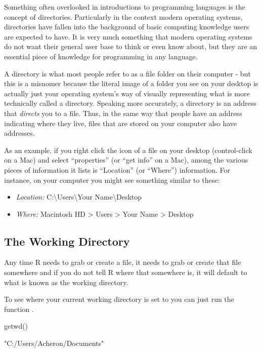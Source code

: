 Something often overlooked in introductions to programming languages is the concept of directories. Particularly in the context modern operating systems, directories have fallen into the background of basic computing knowledge users are expected to have. It is very much something that modern operating systems do not want their general user base to think or even know about, but they are an essential piece of knowledge for programming in any language.

A \gls{directory} is what most people refer to as a file folder on their computer - but this is a misnomer because the literal image of a folder you see on your desktop is actually just your operating system's way of visually representing what is more technically called a directory. Speaking more accurately, a directory is an address that \textit{directs} you to a file. Thus, in the same way that people have an address indicating where they live, files that are stored on your computer also have addresses.

As an example, if you right click the icon of a file on your desktop (control-click on a Mac) and select ``properties'' (or ``get info'' on a Mac), among the various pieces of information it lists is ``Location'' (or ``Where'') information.  For instance, on your computer you might see something similar to these:

\begin{itemize}
    \item \textit{Location:} C:\textbackslash Users\textbackslash Your Name\textbackslash Desktop
    \item \textit{Where:} Macintosh HD > Users > Your Name > Desktop
\end{itemize}

\subsection{The Working Directory}

Any time R needs to grab or create a file, it needs to grab or create that file somewhere and if you do not tell R where that somewhere is, it will default to what is known as the \gls{working directory}.

To see where your current working directory is set to you can just run the function .

\begin{inR}
getwd()
\end{inR}

\begin{outR}
[1] "C:/Users/Acheron/Documents"
\end{outR}

